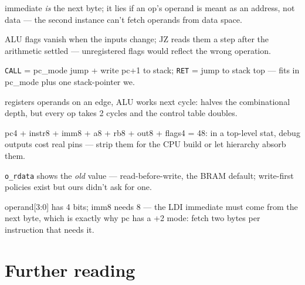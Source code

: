 \begin{description}
immediate \emph{is} the next byte; it lies if an op's operand is
meant as an address, not data --- the second instance can't fetch
operands from data space.
\item[No flags reg (hard)] ALU flags vanish when the inputs change;
JZ reads them a step after the arithmetic settled --- unregistered
flags would reflect the wrong operation.
\item[Stack (hard)] \texttt{CALL} = pc\_mode jump + write pc+1 to
stack; \texttt{RET} = jump to stack top --- fits in pc\_mode plus one
stack-pointer we.
\item[Two-stage (hard)] registers operands on an edge, ALU works next
cycle: halves the combinational depth, but every op takes 2 cycles
and the control table doubles.
\item[48 OBUF (hard)] pc4 + instr8 + imm8 + a8 + rb8 + out8 + flags4
= 48: in a top-level stat, debug outputs cost real pins --- strip
them for the CPU build or let hierarchy absorb them.
\item[RAW hazard (hard)] \texttt{o\_rdata} shows the \emph{old} value
--- read-before-write, the BRAM default; write-first policies exist
but ours didn't ask for one.
\item[Nibble budget (hard)] operand[3:0] has 4 bits; imm8 needs 8 ---
the LDI immediate must come from the next byte, which is exactly
why pc has a +2 mode: fetch two bytes per instruction that needs it.
\end{description}

\section*{Further reading}

